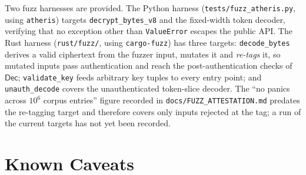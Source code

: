 \documentclass[11pt,a4paper]{article}
\begin{document}
Two fuzz harnesses are provided. The Python harness
(\texttt{tests/fuzz\_atheris.py}, using \texttt{atheris}) targets
\texttt{decrypt\_bytes\_v8} and the fixed-width token decoder, verifying
that no exception other than \texttt{ValueError} escapes the public API.
The Rust harness (\texttt{rust/fuzz/}, using \texttt{cargo-fuzz}) has three
targets: \texttt{decode\_bytes} derives a valid ciphertext from the fuzzer
input, mutates it and \emph{re-tags} it, so mutated inputs pass
authentication and reach the post-authentication checks of
$\mathsf{Dec}$; \texttt{validate\_key} feeds arbitrary key tuples to every
entry point; and \texttt{unauth\_decode} covers the unauthenticated
token-slice decoder. The ``no panics across $10^6$ corpus entries'' figure
recorded in \texttt{docs/FUZZ\_ATTESTATION.md} predates the re-tagging
target and therefore covers only inputs rejected at the tag; a run of the
current targets has not yet been recorded.

\section{Known Caveats}
\label{sec:caveats}
\end{document}

